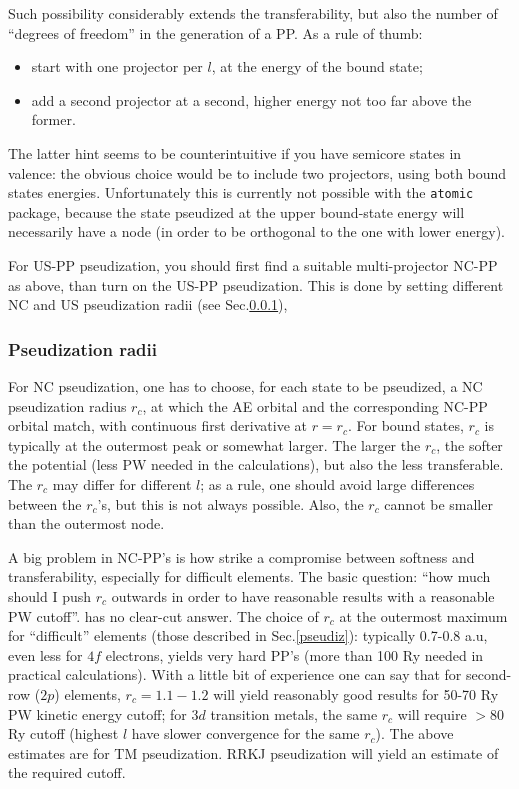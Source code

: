 \documentclass[12pt]{article}
\begin{document}
Such possibility considerably extends the transferability, but also the 
number of ``degrees of freedom'' in the generation of a PP. As a rule of 
thumb: 
\begin{itemize}
\item start with one projector per $l$, at the energy of the bound state;
\item add a second projector at a second, higher energy not too far above 
the former. 
\end{itemize}
The latter hint seems to be counterintuitive if you have semicore states 
in valence: the obvious choice would be to include two projectors, using 
both bound states energies. Unfortunately this is currently not possible 
with the \texttt{atomic} package, because the state pseudized at the upper 
bound-state energy will necessarily have a node (in order to be orthogonal 
to the one with lower energy).

For US-PP pseudization, you should first find a suitable multi-projector 
NC-PP as above, than turn on the US-PP pseudization. This is done by
setting different NC and US pseudization radii (see Sec.\ref{radii}),

\subsubsection{Pseudization radii}
\label{radii}

For NC pseudization, one has to choose, for each state to be pseudized,
a NC pseudization radius $r_c$, at which the AE orbital and the 
corresponding NC-PP orbital match, with continuous first derivative 
at $r=r_c$. For bound states, $r_c$ is typically at the outermost peak or 
somewhat larger. The larger the $r_c$, the softer the potential 
(less PW needed in the calculations), but also the less transferable.
The $r_c$ may differ for different $l$; as a rule, one should avoid large
differences between the $r_c$'s, but this is not always possible. Also,
the $r_c$ cannot be smaller than the outermost node.

A big problem in NC-PP's is how strike a compromise between softness
and transferability, especially for difficult elements. The basic question:
``how much should I push $r_c$ outwards in order to have reasonable results 
with a reasonable PW cutoff''. has no clear-cut answer. The choice of $r_c$ 
at the outermost maximum for ``difficult'' elements (those described in 
Sec.\ref{pseudiz}): typically 0.7-0.8 a.u, even less for $4f$ electrons, 
yields very hard PP's 
(more than 100 Ry needed in practical calculations). With a little bit of 
experience one can say that for second-row ($2p$) elements, $r_c=1.1-1.2$ 
will yield reasonably good results for 50-70 Ry PW kinetic energy cutoff; 
for $3d$ transition metals, the same $r_c$ will require $> 80$ Ry cutoff
(highest $l$ have slower convergence for the same $r_c$). The above
estimates are for TM pseudization. RRKJ pseudization will yield an
estimate of the required cutoff.
\end{document}
